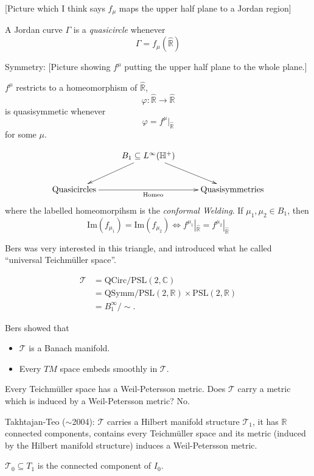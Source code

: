 [Picture which I think
says $f_\mu$ maps the upper half plane
to a Jordan region]

\begin{definition}
\label{definition-quasicircle}
A Jordan curve $\Gamma$ is a
{\it quasicircle} whenever
$$
\Gamma=f_\mu(\hat{\mathbb{R}})
$$
\end{definition}

\noindent
Symmetry:
[Picture showing $f^\mu$
putting the upper half plane
to the whole plane.]

$f^\mu$ restricts to a homeomorphism
of $\hat{\mathbb{R}}$,
$$
\varphi:\hat{\mathbb{R}}
\to \hat{\mathbb{R}}
$$
is quasisymmetic whenever
$$
\varphi=f^\mu|_{\hat{\mathbb{R}}}
$$
for some $\mu$.

$$
\xymatrix{
& B_1\subseteq L^\infty
(\mathbb{H}^+)\ar[dl]\ar[dr]\\
\text{Quasicircles}
\ar[rr]_{\text{Homeo}}
&&
\text{Quasisymmetries}
}
$$
where the labelled homeomorpihsm
is the {\it conformal Welding}.
If $\mu_1, \mu_2 \in B_1$, then
$$
\text{Im}(f_{\mu_1})
= \text{Im}(f_{\mu_2})
\iff
f^{\mu_1}|_{\hat{\mathbb{R}}}
=f^{\mu_2}|_{\hat{\mathbb{R}}}
$$

Bers was very interested in this triangle,
and introduced what he called
``universal Teichmüller space''.

$$
\begin{aligned}
\mathcal{T}&=\text{QCirc}/
\text{PSL}(2,\mathbb{C})\\
&=\text{QSymm}/\text{PSL}(2,\mathbb{R})
\times \text{PSL}(2,\mathbb{R})\\
&=B^\infty_1/\sim.
\end{aligned}
$$

Bers showed that
\begin{itemize}
\item $\mathcal{T}$ is a Banach
manifold.
\item Every $TM$ space embeds smoothly
in $\mathcal{T}$.
\end{itemize}

\noindent
Every Teichmüller space has a 
Weil-Petersson metric. Does $\mathcal{T}$
carry a metric which is induced
by a Weil-Petersson metric? No.

Takhtajan-Teo ($\sim$2004):
$\mathcal{T}$ carries a Hilbert
manifold structure $\mathcal{T}_1$,
it has $\mathbb{R}$ connected components,
contains every Teichmüller space
and its metric (induced by the
Hilbert manifold structure)
induces a Weil-Petersson
metric.

\begin{definition}
\label{definition-wp-teichmuller}
$\mathcal{T}_0 \subseteq T_1$
is the connected component of $I_0$.
\end{definition}

